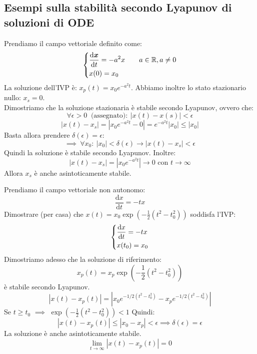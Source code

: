 \subsection{Esempi sulla stabilità secondo Lyapunov di soluzioni di ODE}%
\label{sub:Esempi sulla stabilità secondo Lyapunov di soluzioni di ODE}
\begin{exmp}[1]
    Prendiamo il campo vettoriale definito come:
    \[\begin{dcases}
        \frac{\text{d} \boldsymbol{x}}{\text{d} t} = - a^2x \qquad a \in \mathbb{R}, a\neq 0\\
	x(0)=x_0	
    \end{dcases}\] 
    La soluzione dell'IVP è: $x_p(t)= x_0e^{-a^2t}$. Abbiamo inoltre lo stato stazionario nullo: $x_s = 0$. \\
    Dimostriamo che la soluzione stazionaria è stabile secondo Lyapunov, ovvero che:
    \[
	\forall \epsilon>0  \  \text{ (assegnato)}: \ \left|x(t)-x(s)\right|<\epsilon
    \] 
    \[
	\left|x(t)-x_s\right|= \left|x_0e^{-a^2t}-0\right| = e^{-a^2t}\left|x_0\right| \le \left|x_0\right|
    \] 
    Basta allora prendere $\delta (\epsilon)=\epsilon$:
    \[
	\implies  \ \forall x_0: \ \left|x_0\right|<\delta (\epsilon) \to \left|x(t)-x_s\right|<\epsilon
    \] 
    Quindi la soluzione è stabile secondo Lyapunov. Inoltre:
    \[
	\left|x(t)-x_s\right|=\left|x_0e^{-a^2t}\right|\to 0 \text{ con } t\to \infty
    \] 
    Allora $x_s$ è anche asintoticamente stabile.
\end{exmp}
\noindent
\begin{ex}[2]
    Prendiamo il campo vettoriale non autonomo:
    \[
        \frac{\text{d} x}{\text{d} t} = - tx
    \] 
    Dimostrare (per casa) che $x(t)= x_0\exp\left(-\frac{1}{2}(t^2-t_0^2)\right)$ soddisfa l'IVP:
    \[\begin{dcases}
        \frac{\text{d} x}{\text{d} t} = -tx\\
	x(t_0)= x_0
    \end{dcases}\] 
    Dimostriamo adesso che la soluzione di riferimento:
    \[
        x_p(t)= x_p\exp\left(-\frac{1}{2}(t^2-t_0^2)\right)
    \] 
    è stabile secondo Lyapunov.
    \[
	\left|x(t)-x_p(t)\right|= \left|x_0e^{-1 /2(t^2-t_0^2)} - x_pe^{-1 /2(t^2-t_0^2)}\right|
    \] 
    Se $t\ge t_0$ $\implies$ $\exp \left(- \frac{1}{2}(t^2-t_0^2)\right)<1$ Quindi:
    \[
	\left|x(t)-x_p(t)\right|\le \left|x_0-x_p\right|< \epsilon  \implies  \delta (\epsilon)=\epsilon
    \] 
    La soluzione è anche asintoticamente stabile.
    \[
	\lim_{t \to \infty} \left|x(t)-x_p(t)\right| = 0
    \] 
\end{ex}
